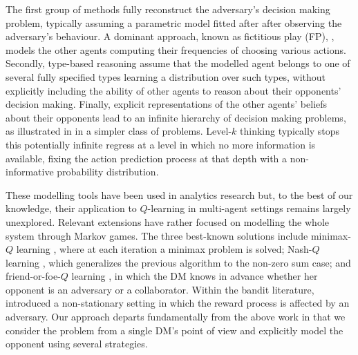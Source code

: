 The first group of methods fully reconstruct the adversary's decision
making problem, typically assuming a parametric model fitted after 
after observing the adversary's behaviour. A dominant approach,
known as fictitious play  (FP), \parencite{brown1951iterative}, models 
the other agents computing their frequencies of choosing various actions.
Secondly, %
type-based reasoning assume that the modelled agent belongs
to one of several fully specified types learning 
a distribution over such types, %
without explicitly including the ability of
other agents to reason about their opponents' decision making. 
Finally, explicit representations of the other agents' beliefs about their
opponents lead to an infinite hierarchy of decision making problems,
as illustrated in \cite{rios2012adversarial} in a  simpler class of problems. Level-$k$ thinking  \parencite{stahl1994experimental} typically stops this potentially infinite regress at a level in which no more information is available, fixing the action prediction process at that depth with a non-informative probability distribution.

These modelling tools have been used in analytics 
research but, to the best
of our knowledge, their application to $Q$-learning in multi-agent settings remains 
largely unexplored. Relevant extensions %
have rather focused on modelling the whole system 
through Markov games. The three best-known solutions include minimax-$Q$ learning \parencite{littman1994markov}, where at each iteration a minimax 
problem is solved; Nash-$Q$ learning \parencite{hu2003nash}, 
which generalizes the previous algorithm to the non-zero sum case;
and friend-or-foe-$Q$ learning \parencite{littman2001friend}, in which the DM knows in advance whether her opponent is an adversary or a collaborator. Within the bandit literature, \parencite{auer1995gambling} introduced a non-stationary setting in which the reward process is affected by an adversary. Our approach departs fundamentally from the above
work in that we consider the problem from a single DM's point of view and 
explicitly model the opponent using several strategies.


